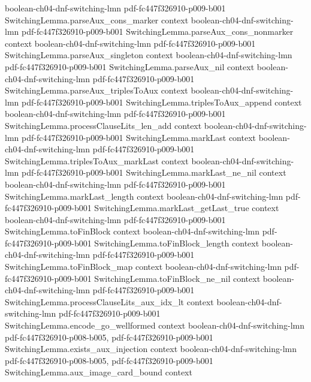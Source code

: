 \begin{lemma}
  {boolean-ch04-dnf-switching-lmn}
  {pdf-fc447f326910-p009-b001}
\proofstep
  {SwitchingLemma.parseAux_cons_marker}
  {context}
  {boolean-ch04-dnf-switching-lmn}
  {pdf-fc447f326910-p009-b001}
\proofstep
  {SwitchingLemma.parseAux_cons_nonmarker}
  {context}
  {boolean-ch04-dnf-switching-lmn}
  {pdf-fc447f326910-p009-b001}
\proofstep
  {SwitchingLemma.parseAux_singleton}
  {context}
  {boolean-ch04-dnf-switching-lmn}
  {pdf-fc447f326910-p009-b001}
\proofstep
  {SwitchingLemma.parseAux_nil}
  {context}
  {boolean-ch04-dnf-switching-lmn}
  {pdf-fc447f326910-p009-b001}
\proofstep
  {SwitchingLemma.parseAux_triplesToAux}
  {context}
  {boolean-ch04-dnf-switching-lmn}
  {pdf-fc447f326910-p009-b001}
\proofstep
  {SwitchingLemma.triplesToAux_append}
  {context}
  {boolean-ch04-dnf-switching-lmn}
  {pdf-fc447f326910-p009-b001}
\proofstep
  {SwitchingLemma.processClauseLits_len_add}
  {context}
  {boolean-ch04-dnf-switching-lmn}
  {pdf-fc447f326910-p009-b001}
\proofstep
  {SwitchingLemma.markLast}
  {context}
  {boolean-ch04-dnf-switching-lmn}
  {pdf-fc447f326910-p009-b001}
\proofstep
  {SwitchingLemma.triplesToAux_markLast}
  {context}
  {boolean-ch04-dnf-switching-lmn}
  {pdf-fc447f326910-p009-b001}
\proofstep
  {SwitchingLemma.markLast_ne_nil}
  {context}
  {boolean-ch04-dnf-switching-lmn}
  {pdf-fc447f326910-p009-b001}
\proofstep
  {SwitchingLemma.markLast_length}
  {context}
  {boolean-ch04-dnf-switching-lmn}
  {pdf-fc447f326910-p009-b001}
\proofstep
  {SwitchingLemma.markLast_getLast_true}
  {context}
  {boolean-ch04-dnf-switching-lmn}
  {pdf-fc447f326910-p009-b001}
\proofstep
  {SwitchingLemma.toFinBlock}
  {context}
  {boolean-ch04-dnf-switching-lmn}
  {pdf-fc447f326910-p009-b001}
\proofstep
  {SwitchingLemma.toFinBlock_length}
  {context}
  {boolean-ch04-dnf-switching-lmn}
  {pdf-fc447f326910-p009-b001}
\proofstep
  {SwitchingLemma.toFinBlock_map}
  {context}
  {boolean-ch04-dnf-switching-lmn}
  {pdf-fc447f326910-p009-b001}
\proofstep
  {SwitchingLemma.toFinBlock_ne_nil}
  {context}
  {boolean-ch04-dnf-switching-lmn}
  {pdf-fc447f326910-p009-b001}
\proofstep
  {SwitchingLemma.processClauseLits_aux_idx_lt}
  {context}
  {boolean-ch04-dnf-switching-lmn}
  {pdf-fc447f326910-p009-b001}
\proofstep
  {SwitchingLemma.encode_go_wellformed}
  {context}
  {boolean-ch04-dnf-switching-lmn}
  {pdf-fc447f326910-p008-b005,
    pdf-fc447f326910-p009-b001}
\proofstep
  {SwitchingLemma.exists_aux_injection}
  {context}
  {boolean-ch04-dnf-switching-lmn}
  {pdf-fc447f326910-p008-b005,
    pdf-fc447f326910-p009-b001}
\proofstep
  {SwitchingLemma.aux_image_card_bound}
  {context}

\end{lemma}
